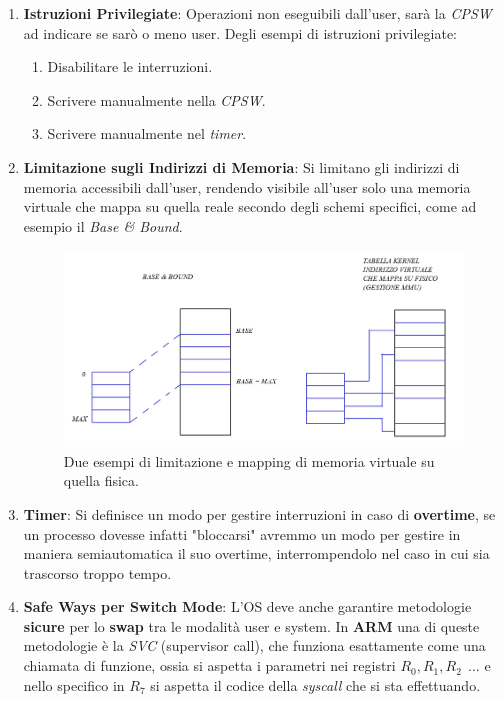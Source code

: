 \documentclass{article}
\begin{document}
\begin{enumerate}
    \item \textbf{Istruzioni Privilegiate}: Operazioni non eseguibili dall'user, sarà la \textit{CPSW} ad indicare se sarò o meno user. Degli esempi di istruzioni privilegiate:
    \begin{enumerate}
        \item Disabilitare le interruzioni.
        \item Scrivere manualmente nella \textit{CPSW}.
        \item Scrivere manualmente nel \textit{timer}.
    \end{enumerate}
    \newpage
    \item \textbf{Limitazione sugli Indirizzi di Memoria}: Si limitano gli indirizzi di memoria accessibili dall'user, rendendo visibile all'user solo una memoria virtuale che mappa su quella reale secondo degli schemi specifici, come ad esempio il \textit{Base \& Bound}.
    \begin{figure}[htbp]
    \center
    \includegraphics[scale=0.5]{img/ind_fisico_virtuale.png}
    \caption{Due esempi di limitazione e mapping di memoria virtuale su quella fisica.}
\end{figure}
\item \textbf{Timer}: Si definisce un modo per gestire interruzioni in caso di \textbf{overtime}, se un processo dovesse infatti "bloccarsi" avremmo un modo per gestire in maniera semiautomatica il suo overtime, interrompendolo nel caso in cui sia trascorso troppo tempo.
\item \textbf{Safe Ways per Switch Mode}: L'OS deve anche garantire metodologie \textbf{sicure} per lo \textbf{swap} tra le modalità user e system. In \textbf{ARM} una di queste metodologie è la \textit{SVC} (supervisor call), che funziona esattamente come una chiamata di funzione, ossia si aspetta i parametri nei registri $R_{0},R_{1},R_{2}\:\:...$ e nello specifico in $R_{7}$ si aspetta il codice della \textit{syscall} che si sta effettuando.


\end{enumerate}
\end{document}
